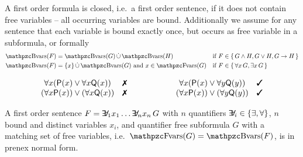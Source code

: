 \begin{definition}\label{def:fof:closed}\label{def:fof:sentence}
	A first order formula is closed, i.e.~a first order {\myem sentence},
	if it does not contain free variables -- all occurring variables are bound.
	Additionally we assume for any sentence
	that each variable is bound exactly once,
	but occurs as free variable in a subformula,
	or formally
	\begin{align*}
	\bvar(F) &= \bvar(G)\disjointunion\bvar(H)
	 &&\text{if } F \in\{\,G\land H,G\lor H,G\limp H\,\}
	\\
	\bvar(F) &= \{x\}\disjointunion\bvar(G)\text{ and } x\in\fvar(G)
	&&\text{if }F \in\{\, \forall x\,G, \exists x\,G\,\}
\end{align*}
\end{definition}

\begin{example}
	\[
	\begin{array}{clccl}
		\forall x ({\mP(x) \lor \forall x {\mQ(x)}}) &
		\text{\xmark}
		&\qquad\qquad
		&
		\forall x ({\mP(x) \lor \forall y {\mQ(y)}}) &
		\text{\cmark}
		\\
		(\forall x {\mP(x)}) \lor (\forall x {\mQ(x)}) &
		\text{\xmark}
		&&
		(\forall x {\mP(x)}) \lor (\forall y {\mQ(y)}) &
		\text{\cmark}
	\end{array}
	\]

\end{example}

\begin{definition}[\PNF]
	A first order sentence $F = \quantify_1 x_1 \ldots \quantify_n x_n\, G$
	with $n$ quantifiers $\quantify_i \in \{\exists,\forall\}$,
	$n$ bound and distinct variables $x_i$,
	and quantifier free subformula $G$ with
	a matching set of free variables, i.e.~$\fvar(G) = \bvar(F)$,
	is in {\myem prenex normal form}.
\end{definition}



